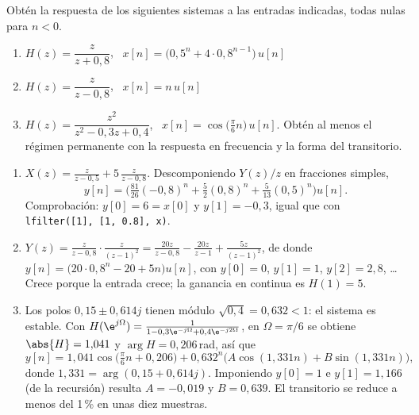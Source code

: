 \documentclass[11pt,a4paper]{scrartcl}
\begin{document}
\begin{ejercicio}
  Obtén la respuesta de los siguientes sistemas a las entradas indicadas, todas nulas para $n<0$.
  \begin{enumerate}[label=\alph*)]
    \item $H(z)=\dfrac{z}{z+0{,}8}$, \ $x[n]=\big(0{,}5^n+4\cdot0{,}8^{n-1}\big)\,u[n]$
    \item $H(z)=\dfrac{z}{z-0{,}8}$, \ $x[n]=n\,u[n]$
    \item $H(z)=\dfrac{z^2}{z^2-0{,}3z+0{,}4}$, \ $x[n]=\cos\big(\tfrac{\pi}{6}n\big)\,u[n]$. Obtén al menos el régimen permanente con la respuesta en frecuencia y la forma del transitorio.
  \end{enumerate}
\end{ejercicio}
\begin{solucion}
  \begin{enumerate}[label=\alph*)]
    \item $X(z)=\frac{z}{z-0{,}5}+5\,\frac{z}{z-0{,}8}$. Descomponiendo $Y(z)/z$ en fracciones simples,
    \[
      y[n]=\Big(\tfrac{81}{26}(-0{,}8)^n+\tfrac52(0{,}8)^n+\tfrac{5}{13}(0{,}5)^n\Big)u[n].
    \]
    Comprobación: $y[0]=6=x[0]$ y $y[1]=-0{,}3$, igual que con \texttt{lfilter([1], [1, 0.8], x)}.
    \item $Y(z)=\frac{z}{z-0{,}8}\cdot\frac{z}{(z-1)^2}=\frac{20z}{z-0{,}8}-\frac{20z}{z-1}+\frac{5z}{(z-1)^2}$, de donde $y[n]=\big(20\cdot0{,}8^n-20+5n\big)u[n]$, con $y[0]=0$, $y[1]=1$, $y[2]=2{,}8$, \ldots Crece porque la entrada crece; la ganancia en continua es $H(1)=5$.
    \item Los polos $0{,}15\pm0{,}614j$ tienen módulo $\sqrt{0{,}4}=0{,}632<1$: el sistema es estable. Con $H(\e^{j\Omega})=\frac{1}{1-0{,}3\e^{-j\Omega}+0{,}4\e^{-j2\Omega}}$, en $\Omega=\pi/6$ se obtiene $\abs{H}=1{,}041$ y $\arg H=0{,}206$\,rad, así que
    \[
      y[n]=1{,}041\cos\big(\tfrac\pi6n+0{,}206\big)+0{,}632^n\big(A\cos(1{,}331n)+B\sin(1{,}331n)\big),
    \]
    donde $1{,}331=\arg(0{,}15+0{,}614j)$. Imponiendo $y[0]=1$ e $y[1]=1{,}166$ (de la recursión) resulta $A=-0{,}019$ y $B=0{,}639$. El transitorio se reduce a menos del 1\,\% en unas diez muestras.
  \end{enumerate}
\end{solucion}
\end{document}
